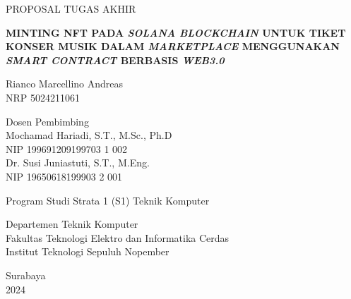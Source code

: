 \begin{large}
  PROPOSAL TUGAS AKHIR
\end{large}

\vspace{\fill}

\begin{spacing}{1.5}
  \begin{Large}
    \textbf{MINTING NFT PADA \textit{SOLANA BLOCKCHAIN} UNTUK TIKET
    KONSER MUSIK DALAM \textit{MARKETPLACE}
    MENGGUNAKAN \textit{SMART CONTRACT} BERBASIS \textit{WEB3.0}}
  \end{Large}
\end{spacing}

\vspace{\fill}

\begin{large}
  Rianco Marcellino Andreas \\
  \textmd{NRP 5024211061}
\end{large}

\vspace{\fill}

\begin{large}
  \textmd{Dosen Pembimbing} \\
  Mochamad Hariadi, S.T., M.Sc., Ph.D \\
  \textmd{NIP 199691209199703 1 002} \\
  Dr. Susi Juniastuti, S.T., M.Eng. \\
  \textmd{NIP 19650618199903 2 001}
\end{large}

\vspace{\fill}

Program Studi Strata 1 (S1) Teknik Komputer \\

\mdseries

Departemen Teknik Komputer \\
Fakultas Teknologi Elektro dan Informatika Cerdas \\
Institut Teknologi Sepuluh Nopember

\vspace{\fill}

Surabaya \\
2024
